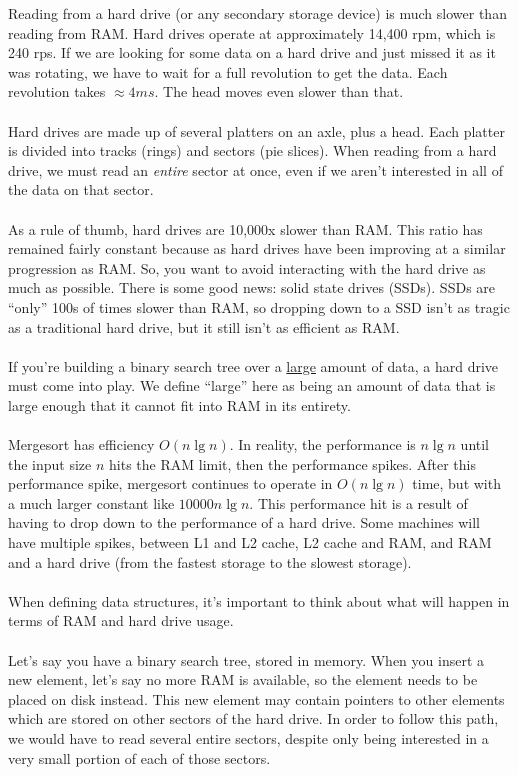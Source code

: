 \documentclass[]{article}
\theoremstyle{definition}
\begin{document}
			Reading from a hard drive (or any secondary storage device) is much slower than reading from RAM. Hard drives operate at approximately 14,400 rpm, which is 240 rps. If we are looking for some data on a hard drive and just missed it as it was rotating, we have to wait for a full revolution to get the data. Each revolution takes $\approx 4 ms$. The head moves even slower than that.
			\\ \\
			Hard drives are made up of several platters on an axle, plus a head. Each platter is divided into tracks (rings) and sectors (pie slices). When reading from a hard drive, we must read an \emph{entire} sector at once, even if we aren't interested in all of the data on that sector.
			\\ \\
			As a rule of thumb, hard drives are 10,000x slower than RAM. This ratio has remained fairly constant because as hard drives have been improving at a similar progression as RAM. So, you want to avoid interacting with the hard drive as much as possible. There is some good news: solid state drives (SSDs). SSDs are ``only'' 100s of times slower than RAM, so dropping down to a SSD isn't as tragic as a traditional hard drive, but it still isn't as efficient as RAM.
			\\ \\
			If you're building a binary search tree over a \underline{large} amount of data, a hard drive must come into play. We define ``large'' here as being an amount of data that is large enough that it cannot fit into RAM in its entirety. 
			\\ \\
			Mergesort has efficiency $O(n \lg n)$. In reality, the performance is $n \lg n$ until the input size $n$ hits the RAM limit, then the performance spikes. After this performance spike, mergesort continues to operate in $O(n \lg n)$ time, but with a much larger constant like $10000n \lg n$. This performance hit is a result of having to drop down to the performance of a hard drive. Some machines will have multiple spikes, between L1 and L2 cache, L2 cache and RAM, and RAM and a hard drive (from the fastest storage to the slowest storage). 
			\\ \\
			When defining data structures, it's important to think about what will happen in terms of RAM and hard drive usage.
			\\ \\
			Let's say you have a binary search tree, stored in memory. When you insert a new element, let's say no more RAM is available, so the element needs to be placed on disk instead. This new element may contain pointers to other elements which are stored on other sectors of the hard drive. In order to follow this path, we would have to read several entire sectors, despite only being interested in a very small portion of each of those sectors. 
\end{document}
